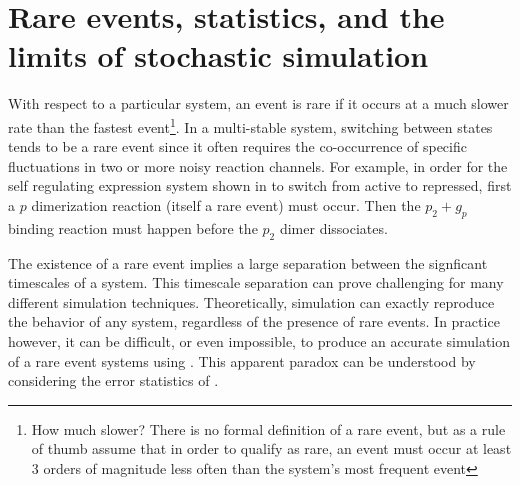 
\section{Rare events, statistics, and the limits of stochastic simulation}

With respect to a particular system, an event is rare\supercite{Baron:2017tf} if it occurs at a much slower rate than the fastest event\footnote{How much slower? There is no formal definition of a rare event, but as a rule of thumb assume that in order to qualify as rare, an event must occur at least 3 orders of magnitude less often than the system's most frequent event}. In a multi-stable system, switching between states tends to be a rare event since it often requires the co-occurrence of specific fluctuations in two or more noisy reaction channels. For example, in order for the self regulating expression system shown in  to switch from active to repressed, first a $p$ dimerization reaction (itself a rare event) must occur. Then the $p_{2} + g_{p}$ binding reaction must happen before the $p_{2}$ dimer dissociates.

The existence of a rare event implies a large separation between the signficant timescales of  a system. This timescale separation can prove challenging\supercite{Shampine:1979em,Petzold:1983if} for many different simulation techniques. Theoretically,  simulation can exactly reproduce the behavior of any system, regardless of the presence of rare events. In practice however, it can be difficult, or even impossible, to produce an accurate simulation of a rare event systems using . This apparent paradox can be understood by considering the error statistics of .


